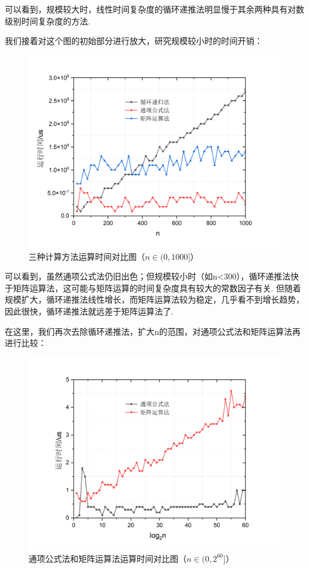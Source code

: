 \documentclass[UTF8]{ctexart}
\begin{document}
可以看到，规模较大时，线性时间复杂度的循环递推法明显慢于其余两种具有对数级别时间复杂度的方法.\par
我们接着对这个图的初始部分进行放大，研究规模较小时的时间开销：
\begin{figure}[H]\begin{center}
	\includegraphics[scale = 0.5]{graph4.png}
	\caption{三种计算方法运算时间对比图（$n\in (0,1000]$）}
\end{center}\end{figure}
可以看到，虽然通项公式法仍旧出色；但规模较小时（如n<300），循环递推法快于矩阵运算法，这可能与矩阵运算的时间复杂度具有较大的常数因子有关. 但随着规模扩大，循环递推法线性增长，而矩阵运算法较为稳定，几乎看不到增长趋势，因此很快，循环递推法就远差于矩阵运算法了.\par
在这里，我们再次去除循环递推法，扩大n的范围，对通项公式法和矩阵运算法再进行比较：
\begin{figure}[H]\begin{center}
	\includegraphics[scale = 0.5]{graph3.png}
	\caption{通项公式法和矩阵运算法运算时间对比图（$n\in (0,2^{60}]$）}
\end{center}\end{figure}
\end{document}
